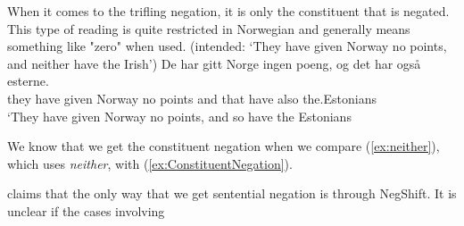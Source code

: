 \documentclass[12pt, letterpaper]{article}
\begin{document}
\ex When it comes to the trifling negation, it is only the constituent that is negated. This type of reading is quite restricted in Norwegian and generally means something like "zero" when used. 
	\trans (intended: `They have given Norway no points, and neither have the Irish') \label{ex:neither}
	\ex 
	\gll De har gitt Norge ingen poeng, og det har også esterne.\\
	they have given Norway no points and that have also the.Estonians\\
	\trans ‘They have given Norway no points, and so have the Estonians \label{ex:ConstituentNegation}
	\z 
	
\ex We know that we get the constituent negation when we compare (\ref{ex:neither}), which uses \emph{neither}, with (\ref{ex:ConstituentNegation}).

\ex \citeauthor{svenoniusStrainsNegationNorwegian2002} claims that the only way that we get sentential negation is through NegShift.
	\ea It is unclear if the cases involving 
	\z 

\z
\end{document}
